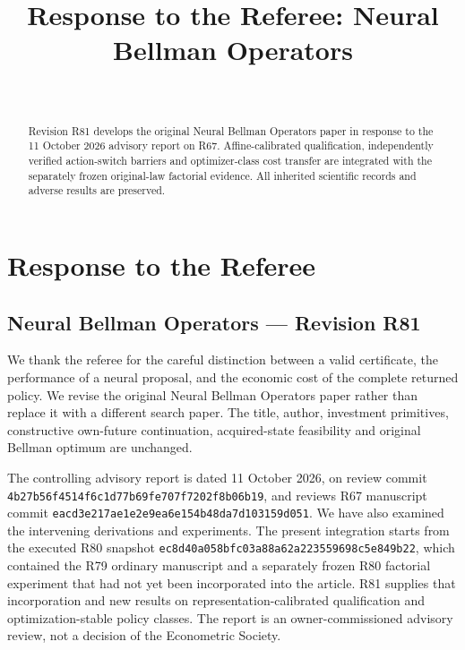 \documentclass[ecta,nameyear,draft]{econsocart}
\begin{document}
\begin{frontmatter}
\title{Response to the Referee: Neural Bellman Operators}
\begin{aug}
\author[id=au1,addressref={add1}]{~}
\address[id=add1]{Peking University}
\end{aug}
\begin{abstract}Revision R81 develops the original Neural Bellman Operators paper in response to the 11 October 2026 advisory report on R67. Affine-calibrated qualification, independently verified action-switch barriers and optimizer-class cost transfer are integrated with the separately frozen original-law factorial evidence. All inherited scientific records and adverse results are preserved.\end{abstract}
\end{frontmatter}
\providecommand{\tightlist}{\setlength{\itemsep}{0pt}\setlength{\parskip}{0pt}}
\hypertarget{response-to-the-referee}{%
\section{Response to the Referee}\label{response-to-the-referee}}

\hypertarget{neural-bellman-operators-revision-r81}{%
\subsection{Neural Bellman Operators --- Revision
R81}\label{neural-bellman-operators-revision-r81}}

We thank the referee for the careful distinction between a valid
certificate, the performance of a neural proposal, and the economic cost
of the complete returned policy. We revise the original Neural Bellman
Operators paper rather than replace it with a different search paper.
The title, author, investment primitives, constructive own-future
continuation, acquired-state feasibility and original Bellman optimum
are unchanged.

The controlling advisory report is dated 11 October 2026, on review
commit \nolinkurl{4b27b56f4514f6c1d77b69fe707f7202f8b06b19}, and reviews
R67 manuscript commit \nolinkurl{eacd3e217ae1e2e9ea6e154b48da7d103159d051}.
We have also examined the intervening derivations and experiments. The
present integration starts from the executed R80 snapshot
\nolinkurl{ec8d40a058bfc03a88a62a223559698c5e849b22}, which contained the
R79 ordinary manuscript and a separately frozen R80 factorial experiment
that had not yet been incorporated into the article. R81 supplies that
incorporation and new results on representation-calibrated qualification
and optimization-stable policy classes. The report is an
owner-commissioned advisory review, not a decision of the Econometric
Society.
\end{document}
